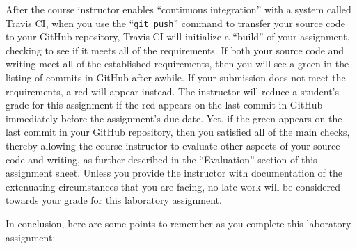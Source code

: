 \documentclass[11pt]{article}
\newcommand{\gitpush}{\command{git push}}
\newcommand{\command}[1]{``\lstinline{#1}''}
\newcommand{\step}[1]{``{#1}''}
\newcommand{\checkmark}{\ding{51}}
\newcommand{\naughtmark}{\ding{55}}
\begin{document}
After the course instructor enables \step{continuous integration} with a system
called Travis CI, when you use the \gitpush{} command to transfer your source
code to your GitHub repository, Travis CI will initialize a \step{build} of your
assignment, checking to see if it meets all of the requirements. If both your
source code and writing meet all of the established requirements, then you will
see a green \checkmark{} in the listing of commits in GitHub after awhile. If
your submission does not meet the requirements, a red \naughtmark{} will appear
instead. The instructor will reduce a student's grade for this assignment if the
red \naughtmark{} appears on the last commit in GitHub immediately before the
assignment's due date. Yet, if the green \checkmark{} appears on the last commit
in your GitHub repository, then you satisfied all of the main checks, thereby
allowing the course instructor to evaluate other aspects of your source code and
writing, as further described in the \step{Evaluation} section of this
assignment sheet. Unless you provide the instructor with documentation of the
extenuating circumstances that you are facing, no late work will be considered
towards your grade for this laboratory assignment.

In conclusion, here are some points to remember as you complete this laboratory
assignment:
\end{document}
